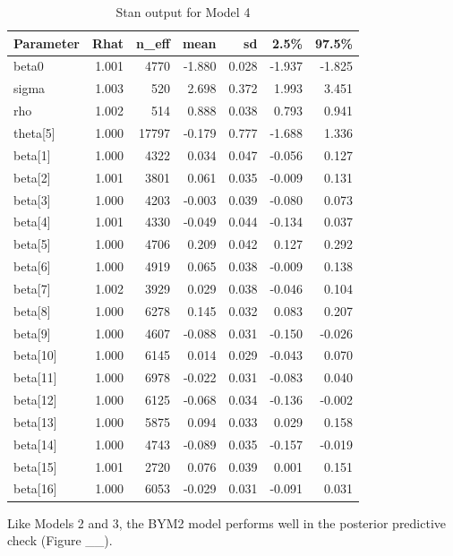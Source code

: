 \documentclass[]{article}
\begin{document}
\begin{table}[ht]
\centering
\begin{tabular}{lrrrrrr}
  \toprule
Parameter & Rhat & n\_eff & mean & sd & 2.5\% & 97.5\% \\ 
  \midrule
beta0 & 1.001 & 4770 & -1.880 & 0.028 & -1.937 & -1.825 \\ 
  sigma & 1.003 &  520 & 2.698 & 0.372 & 1.993 & 3.451 \\ 
  rho & 1.002 &  514 & 0.888 & 0.038 & 0.793 & 0.941 \\ 
  theta[5] & 1.000 & 17797 & -0.179 & 0.777 & -1.688 & 1.336 \\ 
  beta[1] & 1.000 & 4322 & 0.034 & 0.047 & -0.056 & 0.127 \\ 
  beta[2] & 1.001 & 3801 & 0.061 & 0.035 & -0.009 & 0.131 \\ 
  beta[3] & 1.000 & 4203 & -0.003 & 0.039 & -0.080 & 0.073 \\ 
  beta[4] & 1.001 & 4330 & -0.049 & 0.044 & -0.134 & 0.037 \\ 
  beta[5] & 1.000 & 4706 & 0.209 & 0.042 & 0.127 & 0.292 \\ 
  beta[6] & 1.000 & 4919 & 0.065 & 0.038 & -0.009 & 0.138 \\ 
  beta[7] & 1.002 & 3929 & 0.029 & 0.038 & -0.046 & 0.104 \\ 
  beta[8] & 1.000 & 6278 & 0.145 & 0.032 & 0.083 & 0.207 \\ 
  beta[9] & 1.000 & 4607 & -0.088 & 0.031 & -0.150 & -0.026 \\ 
  beta[10] & 1.000 & 6145 & 0.014 & 0.029 & -0.043 & 0.070 \\ 
  beta[11] & 1.000 & 6978 & -0.022 & 0.031 & -0.083 & 0.040 \\ 
  beta[12] & 1.000 & 6125 & -0.068 & 0.034 & -0.136 & -0.002 \\ 
  beta[13] & 1.000 & 5875 & 0.094 & 0.033 & 0.029 & 0.158 \\ 
  beta[14] & 1.000 & 4743 & -0.089 & 0.035 & -0.157 & -0.019 \\ 
  beta[15] & 1.001 & 2720 & 0.076 & 0.039 & 0.001 & 0.151 \\ 
  beta[16] & 1.000 & 6053 & -0.029 & 0.031 & -0.091 & 0.031 \\ 
   \bottomrule
\end{tabular}
\caption{Stan output for Model 4} 
\end{table}

Like Models 2 and 3, the BYM2 model performs well in the posterior
predictive check (Figure \_\_).
\end{document}
